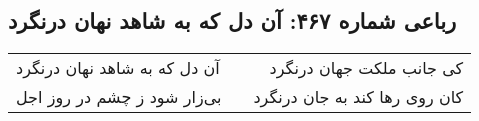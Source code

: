 \begin{center}
\section*{رباعی شماره ۴۶۷: آن دل که به شاهد نهان درنگرد}
\label{sec:0467}
\begin{longtable}{l p{0.5cm} r}
آن دل که به شاهد نهان درنگرد
&&
کی جانب ملکت جهان درنگرد
\\
بی‌زار شود ز چشم در روز اجل
&&
کان روی رها کند به جان درنگرد
\\
\end{longtable}
\end{center}
